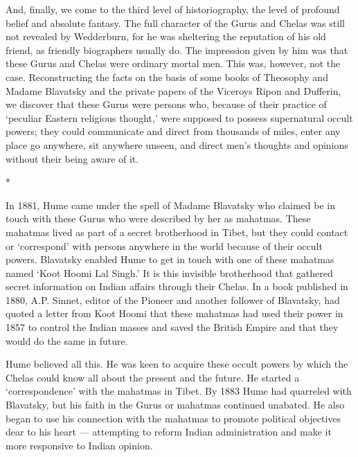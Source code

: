 And, finally, we come to the third level of historiography, the level of profound belief and absolute fantasy. The full character of the Gurus and Chelas was still not revealed by Wedderburn, for he was sheltering the reputation of his old friend, as friendly biographers usually do. The impression given by him was that these Gurus and Chelas were ordinary mortal men. This was, however, not the case. Reconstructing the facts on the basis of some books of Theosophy and Madame Blavatsky and the private papers of the Viceroys Ripon and Dufferin, we discover that these Gurus were persons who, because of their practice of ‘peculiar Eastern religious thought,’ were supposed to possess supernatural occult powers; they could communicate and direct from thousands of miles, enter any place go anywhere, sit anywhere unseen, and direct men’s thoughts and opinions without their being aware of it.

\begin{center}*\end{center}

In 1881, Hume came under the spell of Madame Blavatsky who claimed be in touch with these Gurus who were described by her as mahatmas. These mahatmas lived as part of a secret brotherhood in Tibet, but they could contact or ‘correspond’ with persons anywhere in the world because of their occult powers. Blavatsky enabled Hume to get in touch with one of these mahatmas named ‘Koot Hoomi Lal Singh.’ It is this invisible brotherhood that gathered secret information on Indian affairs through their Chelas. In a book published in 1880, A.P. Sinnet, editor of the Pioneer and another follower of Blavatsky, had quoted a letter from Koot Hoomi that these mahatmas had used their power in 1857 to control the Indian masses and saved the British Empire and that they would do the same in future.

Hume believed all this. He was keen to acquire these occult powers by which the Chelas could know all about the present and the future. He started a ‘correspondence’ with the mahatmas in Tibet. By 1883 Hume had quarreled with Blavatsky, but his faith in the Gurus or mahatmas continued unabated. He also began to use his connection with the mahatmas to promote political objectives dear to his heart — attempting to reform Indian administration and make it more responsive to Indian opinion.

